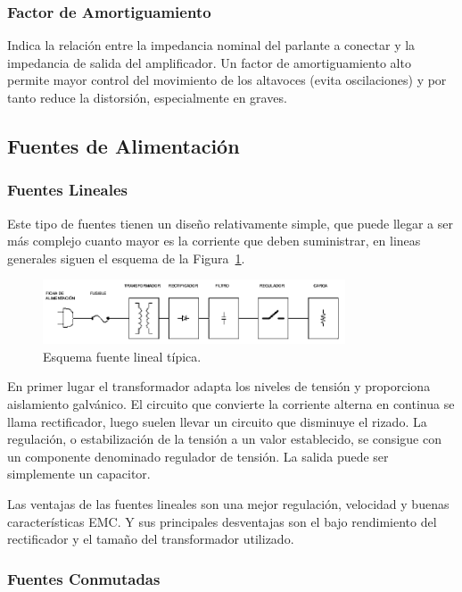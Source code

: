 \subsubsection*{Factor de Amortiguamiento}

Indica la relación entre la impedancia nominal del parlante a conectar y la impedancia de salida del amplificador. Un factor de amortiguamiento alto permite mayor control del movimiento de los 
altavoces (evita oscilaciones) y por tanto reduce la distorsión, especialmente en graves. 
\bigskip
\subsection{Fuentes de Alimentación}

\subsubsection*{Fuentes Lineales}

Este tipo de fuentes tienen un diseño relativamente simple, que puede llegar a ser más complejo cuanto mayor es la corriente que deben suministrar, en lineas generales siguen el esquema de la Figura~\ref{fuente_lineal_tipo}.

\begin{figure}[H]
\centering
\includegraphics[width=0.8\textwidth]{img/fuente_lineal_tipo.png}
\caption{Esquema fuente lineal típica.}
\label{fuente_lineal_tipo} 
\end{figure}

En primer lugar el transformador adapta los niveles de tensión y proporciona aislamiento galvánico. El circuito que convierte la corriente alterna en continua se llama rectificador, luego suelen llevar un circuito que disminuye el rizado. La regulación, o estabilización de la tensión a un valor establecido, se consigue con un componente denominado regulador de tensión. La salida puede ser simplemente un capacitor. 

Las ventajas de las fuentes lineales son una mejor regulación, velocidad y buenas características EMC. Y sus principales desventajas son el bajo rendimiento del rectificador y el tamaño del transformador utilizado. 

\subsubsection*{Fuentes Conmutadas}


